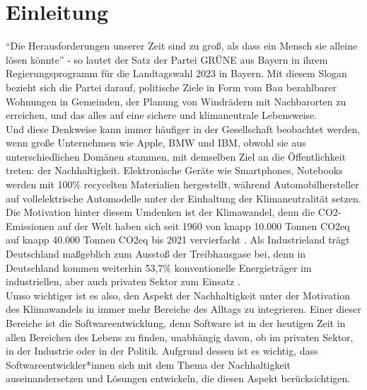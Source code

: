 \chapter{Einleitung} %
\enquote{Die Herausforderungen unserer Zeit sind zu groß, als dass ein Mensch sie alleine lösen könnte} - so lautet der Satz der Partei GRÜNE aus Bayern in ihrem Regierungsprogramm für die Landtagswahl 2023 in Bayern. Mit diesem Slogan bezieht sich die Partei darauf, politische Ziele in Form vom Bau bezahlbarer Wohnungen in Gemeinden, der Planung von Windrädern mit Nachbarorten zu erreichen, und das alles auf eine sichere und klimaneutrale Lebensweise. \\ Und diese Denkweise kann immer häufiger in der Gesellschaft beobachtet werden, wenn große Unternehmen wie Apple, BMW und IBM, obwohl sie aus unterschiedlichen Domänen stammen, mit demselben Ziel an die Öffentlichkeit treten: der Nachhaltigkeit. Elektronische Geräte wie Smartphones, Notebooks werden mit 100\% recycelten Materialien hergestellt, während Automobilhersteller auf vollelektrische Automodelle unter der Einhaltung der Klimaneutralität setzen. Die Motivation hinter diesem Umdenken ist der Klimawandel, denn die CO2-Emissionen auf der Welt haben sich seit 1960 von knapp 10.000 Tonnen CO2eq auf knapp 40.000 Tonnen CO2eq bis 2021 vervierfacht \cite{GlobalCarbonAtlas2023}. Als Industrieland trägt Deutschland maßgeblich zum Ausstoß der Treibhausgase bei, denn in Deutschland kommen weiterhin 53,7\% konventionelle Energieträger im industriellen, aber auch privaten Sektor zum Einsatz \cite{StatistischesBundesamt2023}. \\
Umso wichtiger ist es also, den Aspekt der Nachhaltigkeit unter der Motivation des Klimawandels in immer mehr Bereiche des Alltags zu integrieren. Einer dieser Bereiche ist die Softwareentwicklung, denn Software ist in der heutigen Zeit in allen Bereichen des Lebens zu finden, unabhängig davon, ob im privaten Sektor, in der Industrie oder in der Politik. Aufgrund dessen ist es wichtig, dass Softwareentwickler*innen sich mit dem Thema der Nachhaltigkeit auseinandersetzen und Lösungen entwickeln, die diesen Aspekt berücksichtigen.

